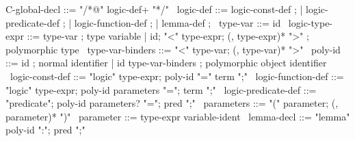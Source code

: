 \begin{syntax}
  C-global-decl ::= "/*@" logic-def+ "*/"
  \
  logic-def ::= logic-const-def ;
          | logic-predicate-def ;
          | logic-function-def ;
          | lemma-def ;
  \
  type-var ::= id
  \
  logic-type-expr ::= type-var ; type variable
  | id;
    "<" type-expr;
    (, type-expr)* ">" ; polymorphic type
  \
  type-var-binders ::= "<" type-var;
                       (, type-var)* ">"
  \
  poly-id ::= id ; normal identifier
  | id type-var-binders ; polymorphic object identifier
  \
  logic-const-def ::= "logic" type-expr;
    poly-id "=" term ";"
  \
  logic-function-def ::= "logic" type-expr;
  poly-id parameters "=";
  term ";"
  \
  logic-predicate-def ::=
  "predicate";
  poly-id parameters? "=";
  pred ";"
  \
  parameters ::= "(" parameter;
                 (, parameter)* ")"
  \
  parameter ::= type-expr variable-ident
  \
  lemma-decl ::= "lemma" poly-id ":";
                   pred ";"
\end{syntax}